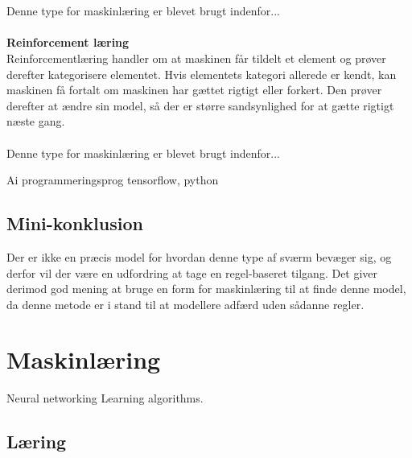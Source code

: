 \\\\
Denne type for maskinlæring er blevet brugt indenfor...
\\\\
\textbf{Reinforcement læring}\\
Reinforcementlæring handler om at maskinen får tildelt et element og prøver derefter kategorisere elementet. Hvis elementets kategori allerede er kendt, kan maskinen få fortalt om maskinen har gættet rigtigt eller forkert. Den prøver derefter at ændre sin model, så der er større sandsynlighed for at gætte rigtigt næste gang.
\\\\
Denne type for maskinlæring er blevet brugt indenfor...

Ai programmeringsprog tensorflow, python
\subsection{Mini-konklusion}
Der er ikke en præcis model for hvordan denne type af sværm bevæger sig, og derfor vil der være en udfordring at tage en regel-baseret tilgang. Det giver derimod god mening at bruge en form for maskinlæring til at finde denne model, da denne metode er i stand til at modellere adfærd uden sådanne regler.


\section{Maskinlæring}

Neural networking
Learning algorithms.



\subsection{Læring}

